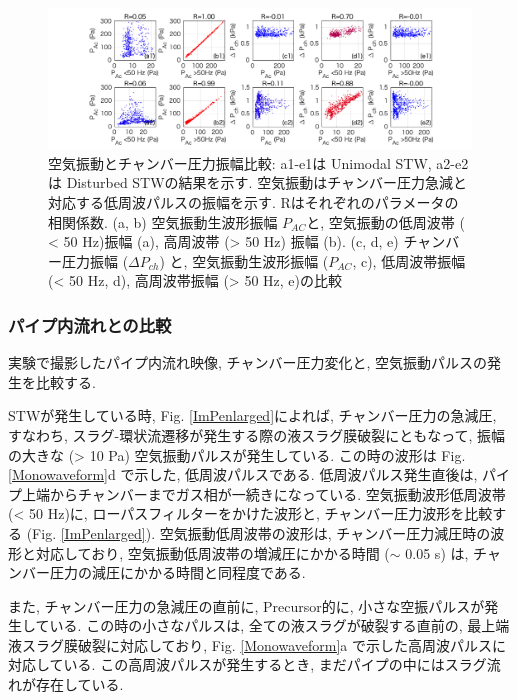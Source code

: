 \documentclass[12pt]{article}
\begin{document}
\begin{landscape}
\begin{figure}[H]
\begin{center}
\includegraphics[scale=1] {PAPCall.png} 
\caption[空気振動とチャンバー圧力振幅比較]
{空気振動とチャンバー圧力振幅比較: a1-e1は Unimodal STW, a2-e2は Disturbed STWの結果を示す. 空気振動はチャンバー圧力急減と対応する低周波パルスの振幅を示す. Rはそれぞれのパラメータの相関係数. (a, b) 空気振動生波形振幅 $P_{AC}$と, 空気振動の低周波帯 ( < 50 Hz)振幅 (a), 高周波帯 (> 50 Hz) 振幅 (b). (c, d, e) チャンバー圧力振幅 ($\Delta P_{ch}$) と, 空気振動生波形振幅 ($P_{AC}$, c), 低周波帯振幅 (< 50 Hz, d), 高周波帯振幅 (> 50 Hz, e)の比較}
\label{PAPCall}
\end{center}
\end{figure} 
\end{landscape}




\clearpage
\subsubsection{パイプ内流れとの比較}
実験で撮影したパイプ内流れ映像, チャンバー圧力変化と, 空気振動パルスの発生を比較する.

STWが発生している時, Fig. \ref{ImPenlarged}によれば, チャンバー圧力の急減圧, すなわち, スラグ-環状流遷移が発生する際の液スラグ膜破裂にともなって, 振幅の大きな (> 10 Pa) 空気振動パルスが発生している. 
この時の波形は Fig. \ref{Monowaveform}d で示した, 低周波パルスである. 低周波パルス発生直後は, パイプ上端からチャンバーまでガス相が一続きになっている.
空気振動波形低周波帯 (< 50 Hz)に, ローパスフィルターをかけた波形と, チャンバー圧力波形を比較する (Fig. \ref{ImPenlarged}). 空気振動低周波帯の波形は, チャンバー圧力減圧時の波形と対応しており, 空気振動低周波帯の増減圧にかかる時間 ($\sim$ 0.05 s) は, チャンバー圧力の減圧にかかる時間と同程度である.

また, チャンバー圧力の急減圧の直前に, Precursor的に, 小さな空振パルスが発生している. この時の小さなパルスは, 全ての液スラグが破裂する直前の, 最上端液スラグ膜破裂に対応しており, Fig. \ref{Monowaveform}a で示した高周波パルスに対応している. この高周波パルスが発生するとき, まだパイプの中にはスラグ流れが存在している. 
\end{document}
